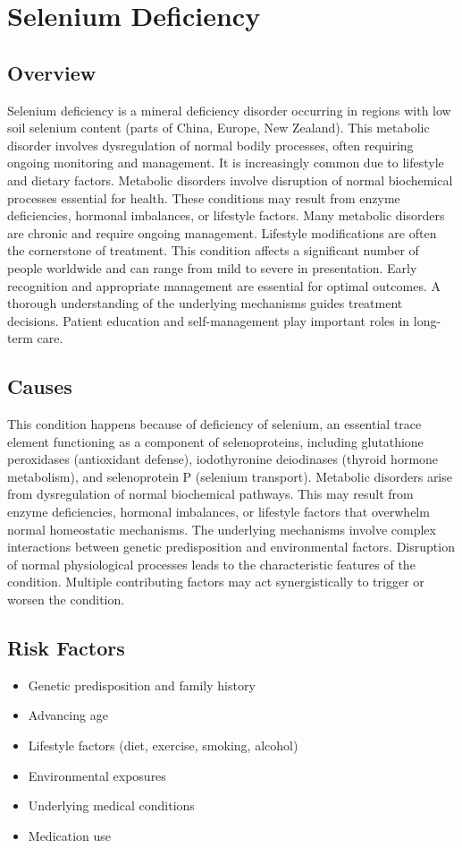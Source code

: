 \chapter{Selenium Deficiency}
\label{sec:Selenium Deficiency}

\section{Overview}
Selenium deficiency is a mineral deficiency disorder occurring in regions with low soil selenium content (parts of China, Europe, New Zealand). This metabolic disorder involves dysregulation of normal bodily processes, often requiring ongoing monitoring and management. It is increasingly common due to lifestyle and dietary factors. Metabolic disorders involve disruption of normal biochemical processes essential for health. These conditions may result from enzyme deficiencies, hormonal imbalances, or lifestyle factors. Many metabolic disorders are chronic and require ongoing management. Lifestyle modifications are often the cornerstone of treatment. This condition affects a significant number of people worldwide and can range from mild to severe in presentation. Early recognition and appropriate management are essential for optimal outcomes. A thorough understanding of the underlying mechanisms guides treatment decisions. Patient education and self-management play important roles in long-term care.
\section{Causes}
This condition happens because of deficiency of selenium, an essential trace element functioning as a component of selenoproteins, including glutathione peroxidases (antioxidant defense), iodothyronine deiodinases (thyroid hormone metabolism), and selenoprotein P (selenium transport). Metabolic disorders arise from dysregulation of normal biochemical pathways. This may result from enzyme deficiencies, hormonal imbalances, or lifestyle factors that overwhelm normal homeostatic mechanisms. The underlying mechanisms involve complex interactions between genetic predisposition and environmental factors. Disruption of normal physiological processes leads to the characteristic features of the condition. Multiple contributing factors may act synergistically to trigger or worsen the condition.
\section{Risk Factors}
\begin{itemize}[noitemsep]
  \item Genetic predisposition and family history
  \item Advancing age
  \item Lifestyle factors (diet, exercise, smoking, alcohol)
  \item Environmental exposures
  \item Underlying medical conditions
  \item Medication use
\end{itemize}
